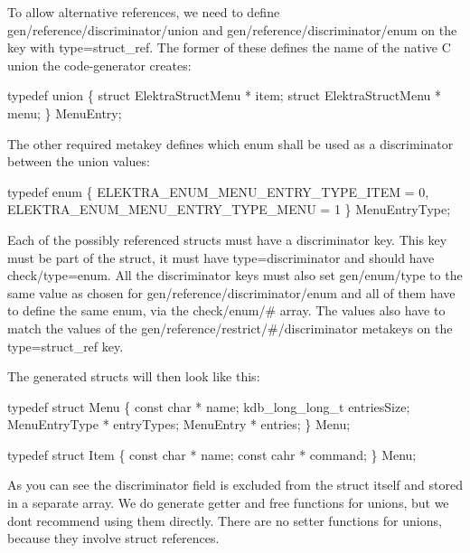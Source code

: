 To allow alternative references, we need to define {\ttfamily gen/reference/discriminator/union} and {\ttfamily gen/reference/discriminator/enum} on the key with {\ttfamily type=struct\+\_\+ref}. The former of these defines the name of the native C {\ttfamily union} the code-\/generator creates\+:


\begin{DoxyCode}
\textcolor{keyword}{typedef} \textcolor{keyword}{union }\{
    \textcolor{keyword}{struct }ElektraStructMenu * item;
    \textcolor{keyword}{struct }ElektraStructMenu * menu;
\} MenuEntry;
\end{DoxyCode}


The other required metakey defines which enum shall be used as a discriminator between the union values\+:


\begin{DoxyCode}
\textcolor{keyword}{typedef} \textcolor{keyword}{enum} \{
    ELEKTRA\_ENUM\_MENU\_ENTRY\_TYPE\_ITEM = 0,
    ELEKTRA\_ENUM\_MENU\_ENTRY\_TYPE\_MENU = 1
\} MenuEntryType;
\end{DoxyCode}


Each of the possibly referenced structs must have a discriminator key. This key must be part of the struct, it must have {\ttfamily type=discriminator} and should have {\ttfamily check/type=enum}. All the discriminator keys must also set {\ttfamily gen/enum/type} to the same value as chosen for {\ttfamily gen/reference/discriminator/enum} and all of them have to define the same enum, via the {\ttfamily check/enum/\#} array. The values also have to match the values of the {\ttfamily gen/reference/restrict/\#/discriminator} metakeys on the {\ttfamily type=struct\+\_\+ref} key.

The generated structs will then look like this\+:


\begin{DoxyCode}
\textcolor{keyword}{typedef} \textcolor{keyword}{struct }Menu
\{
        \textcolor{keyword}{const} \textcolor{keywordtype}{char} * name;
        kdb\_long\_long\_t entriesSize;
        MenuEntryType * entryTypes;
        MenuEntry * entries;
\} Menu;

\textcolor{keyword}{typedef} \textcolor{keyword}{struct }Item
\{
        \textcolor{keyword}{const} \textcolor{keywordtype}{char} * name;
        \textcolor{keyword}{const} cahr * command;
\} Menu;
\end{DoxyCode}


As you can see the discriminator field is excluded from the struct itself and stored in a separate array. We do generate getter and free functions for unions, but we don\textquotesingle{}t recommend using them directly. There are no setter functions for unions, because they involve struct references. 